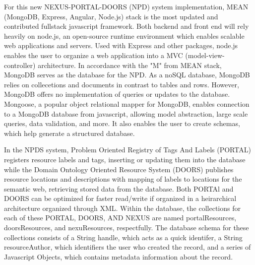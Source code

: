\documentclass[10pt,twocolumn,twoside]{article}
\begin{document}
	For this new NEXUS-PORTAL-DOORS (NPD) system implementation, MEAN (MongoDB, Express, Angular, Node.js)  stack is the most updated and contributed fullstack javascript framework. Both backend and front end will rely heavily on node.js, an open-source runtime environment which enables scalable web applications and servers. Used with Express and other packages, node.js enables the user to organize a web application into a MVC (model-view-controller) architecture. In accordance with the "M" from MEAN stack, MongoDB serves as the database for the NPD. As a noSQL database, MongoDB relies on collecetions and documents in contrast to tables and rows. However, MongoDB offers no implementation of queries or updates to the database. Mongoose, a popular object relational mapper for MongoDB, enables connection to a MongoDB database from javascript, allowing model abstraction, large scale queries, data validation, and more. It also enables the user to create schemas, which help generate a structured database. \newline
	
	In the NPDS system, Problem Oriented Registry of Tags And Labels (PORTAL) registers resource labels and tags, inserting or updating them into the database while the Domain Ontology Oriented Resource System (DOORS) publishes resource locations and descriptions with mapping of labels to locations for the semantic web, retrieving stored data from the database. Both PORTAl and DOORS can be optimized for faster read/write if organized in a heirarchical architecture organized through XML. Within the database, the collections for each of these PORTAL, DOORS, AND NEXUS are named portalResources, doorsResources, and nexuResources, respectfully. The database schema for these collections consists of a String handle, which acts as a quick identifer, a String resourceAuthor, which identifiers the user who created the record, and a series of Javascript Objects, which contains metadata information about the record. 
\end{document}
